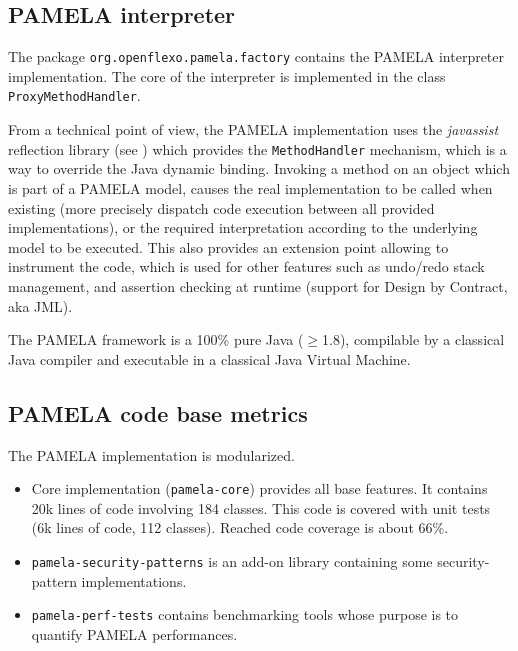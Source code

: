 \subsection{PAMELA interpreter}

The package \texttt{org.openflexo.pamela.factory} contains the PAMELA interpreter implementation. The core of the interpreter is implemented in the class \texttt{ProxyMethodHandler}.

From a technical point of view, the PAMELA implementation uses the \emph{javassist} reflection library (see \cite{shigueru2000}) which provides the \texttt{MethodHandler} mechanism, which is a way to override the Java dynamic binding. Invoking a method on an object which is part of a PAMELA model, causes the real implementation to be called when existing (more precisely dispatch code execution between all provided implementations), or the required interpretation according to the underlying model to be executed. This also provides an extension point allowing to instrument the code, which is used for other features such as undo/redo stack management, and assertion checking at runtime (support for Design by Contract, aka JML).

The PAMELA framework is a 100\% pure Java ($\geq$1.8), compilable by a classical Java compiler and executable in a classical Java Virtual Machine.

\subsection{PAMELA code base metrics}

The PAMELA implementation is modularized. 

\begin{itemize}
    \vspace{-0.2cm}\item Core implementation (\texttt{pamela-core}) provides all base features. %
    It contains 20k lines of code involving 184 classes. This code is covered with unit tests (6k lines of code, 112 classes). Reached code coverage is about 66\%.
    \vspace{-0.2cm}\item \texttt{pamela-security-patterns} is an add-on library containing some security-pattern implementations.
    \vspace{-0.2cm}\item \texttt{pamela-perf-tests} contains benchmarking tools whose purpose is to quantify PAMELA performances. 
\end{itemize}

